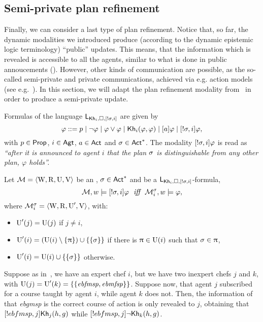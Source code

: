 \subsection{Semi-private plan refinement}
\label{sec:sempriv-planref}

Finally, we can consider a last type of plan refinement. Notice that, so far, the dynamic modalities we introduced produce (according to the dynamic epistemic logic terminology) ``public'' updates. This means, that the information which is revealed is accessible to all the agents, similar to what is done in public annoucements (\cite{Plaza89:lopc}). However, other kinds of communication are possible, as the so-called semi-private and private communications, achieved via e.g. action models (see e.g.~\cite{BR16}). In this section, we will adapt the plan refinement modality from~ in order to produce a semi-private update.

\begin{definition}\label{def:srefgsyntax}
Formulas of the language $\mathsf{L}_{{\sf Kh}_i,\square,[!\sigma,i]}$ are given by
\[
\varphi ::= p \mid \neg\varphi \mid \varphi\vee\varphi \mid {\sf Kh}_i(\varphi,\varphi) \mid [a]\varphi \mid [!\sigma,i]\varphi,
\]
with $p \in {\rm \sf Prop}$, $i\in{\rm \sf Agt}$, $a \in {\rm \sf Act}$ and $\sigma \in {\rm \sf Act}^*$. The modality $[!\sigma,i]\varphi$ is read as \emph{``after it is announced to agent $i$ that the plan $\sigma$ is distinguishable from any other plan, $\varphi$ holds''.}
\end{definition}

\begin{definition}\label{def:srefgsemantics}
Let $\mathcal{M} = \langle \operatorname{W}, \operatorname{R}, \operatorname{U}, \operatorname{V} \rangle$ be an \ults, $\sigma \in {\rm \sf Act}^*$ and  be a $\mathsf{L}_{{\sf Kh}_i,\square,[!\sigma,i]}$-formula, 
\[
\modults,w \models \srefbox{\plan,i}\varphi \ \ \iff \ \ \modults^\plan_i,w \models \varphi,
\]
where $\mathcal{M}^\sigma_i = \langle \operatorname{W},\operatorname{R},\operatorname{U}',\operatorname{V} \rangle$, with:
\begin{itemize}
\item $\operatorname{U}'(j) = \operatorname{U}(j)$ if $j \neq i$,
\item $\operatorname{U}'(i) = (\operatorname{U}(i) \setminus \{ \uppi \}) \cup \{ \{ \sigma \} \}$ if there is $\uppi \in \operatorname{U}(i)$ such that $\sigma \in \uppi$,
\item $\operatorname{U}'(i) = \operatorname{U}(i) \cup \{ \{ \sigma \} \}$ otherwise.
\end{itemize}
\end{definition}

\begin{example}
Suppose as in~, we have an expert chef $i$, but we have two inexpert chefs $j$ and $k$, with $\operatorname{U}(j)=\operatorname{U}'(k)=\{ \{ \mathit{ebfmsp},\mathit{ebmfsp} \} \}$. Suppose now, that agent $j$ subscribed for a course taught by agent $i$, while agent $k$ does not. Then, the information of that \textit{ebgmsp} is the correct course of action is only revealed to $j$, obtaining that $[!ebfmsp,j]{\sf Kh}_j(h,g)$ while $[!ebfmsp,j]\neg{\sf Kh}_k(h,g)$.
\end{example}


